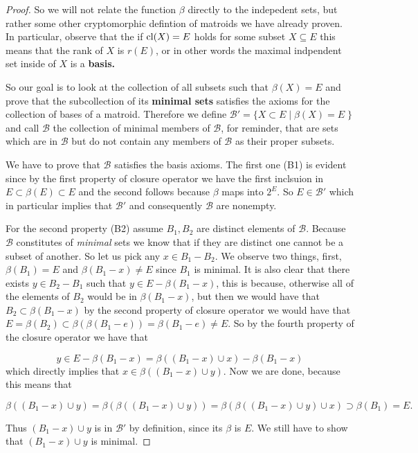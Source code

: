 \begin{proof}
    So we will not relate the function $\beta$ directly to the indepedent sets, but rather some other cryptomorphic defintion of matroids we have already proven. In particular, observe that the if $\mathrm{cl}(X) = E$ holds for some subset $X \subseteq E$ this means that the rank of $X$ is $r(E)$, or in other words the maximal indpendent set inside of $X$ is a \textbf{basis.}

    So our goal is to look at the collection of all subsets such that $\beta(X)= E$ and prove that the subcollection of its \textbf{minimal sets} satisfies the axioms for the collection of bases of a matroid. Therefore we define $\mathcal{B}' = \{X \subset E\; |\; \beta(X) = E\;\}$ and call $\mathcal{B}$ the collection of minimal members of $\mathcal{B}$, for reminder, that are sets which are in $\mathcal{B}$ but do not contain any members of $\mathcal{B}$ as their proper subsets.



We have to prove that $\mathcal{B}$ satisfies the basis axioms. The first one (B1) is evident since by the first property of closure operator we have the first inclsuion in $E\subset\beta(E) \subset E$ and the second follows because $\beta$ maps into $2^E$. So $E \in \mathcal{B}'$ which in particular implies that $\mathcal{B}'$ and consequently $\mathcal{B}$ are nonempty.

For the second property (B2) assume $B_1, B_2$ are distinct elements of $\mathcal{B}.$ Because $\mathcal{B}$ constitutes of \textit{minimal} sets we know that if they are distinct one cannot be a subset of another. So let us pick any $x \in B_1 - B_2$.
We observe two things, first, $\beta(B_1) = E$ and $\beta(B_1 - x) \neq E$ since $B_1$ is minimal. It is also clear that there exists $y \in B_2 - B_1$ such that $y \in E - \beta(B_1 - x)$, this is because, otherwise all of the elements of $B_2$ would be in $\beta(B_1-x)$, but then we would have that $B_2 \subset \beta(B_1 - x)$ by the second property of closure operator we would have that $E = \beta(B_2)\subset \beta(\beta(B_1 - e)) = \beta(B_1 - e) \neq E$. So by the fourth property of the closure operator we have that 

$$y \in E - \beta(B_1 - x) = \beta((B_1 -x )\cup x)-\beta(B_1 - x)$$ which directly implies that $x \in \beta((B_1 - x)\cup y)$. Now we are done, because this means that 

$$\beta((B_1-x)\cup y) = \beta(\beta((B_1-x )\cup y)) = \beta(\beta((B_1 - x)\cup y)\cup x) \supset \beta(B_1) = E.$$


Thus $(B_1 - x) \cup y$ is in $\mathcal{B}'$ by definition, since its $\beta$ is $E$. We still have to show that $(B_1 - x)\cup y$ is minimal.


\end{proof}
